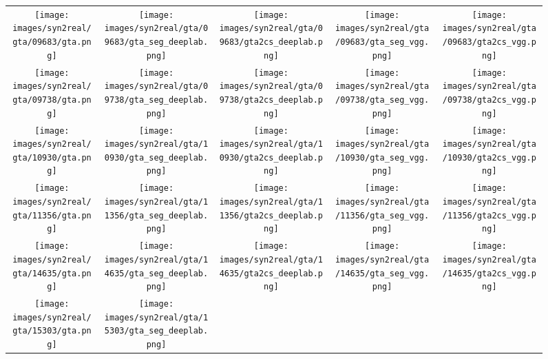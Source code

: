 \documentclass{bmvc2k}
\begin{document}
\begin{figure}[!htb]
	\centering
	\begin{tabular}{@{\hskip2pt}c@{\hskip2pt}c@{\hskip2pt}c@{\hskip2pt}c@{\hskip2pt}c}
		\texttt{[image: images/syn2real/gta/09683/gta.png]}&
		\texttt{[image: images/syn2real/gta/09683/gta\_seg\_deeplab.png]}&
		\texttt{[image: images/syn2real/gta/09683/gta2cs\_deeplab.png]}&
		\texttt{[image: images/syn2real/gta/09683/gta\_seg\_vgg.png]}&
		\texttt{[image: images/syn2real/gta/09683/gta2cs\_vgg.png]}\\
		\texttt{[image: images/syn2real/gta/09738/gta.png]}&
		\texttt{[image: images/syn2real/gta/09738/gta\_seg\_deeplab.png]}&
		\texttt{[image: images/syn2real/gta/09738/gta2cs\_deeplab.png]}&
		\texttt{[image: images/syn2real/gta/09738/gta\_seg\_vgg.png]}&
		\texttt{[image: images/syn2real/gta/09738/gta2cs\_vgg.png]}\\
		\texttt{[image: images/syn2real/gta/10930/gta.png]}&
		\texttt{[image: images/syn2real/gta/10930/gta\_seg\_deeplab.png]}&
		\texttt{[image: images/syn2real/gta/10930/gta2cs\_deeplab.png]}&
		\texttt{[image: images/syn2real/gta/10930/gta\_seg\_vgg.png]}&
		\texttt{[image: images/syn2real/gta/10930/gta2cs\_vgg.png]}\\
		\texttt{[image: images/syn2real/gta/11356/gta.png]}&
		\texttt{[image: images/syn2real/gta/11356/gta\_seg\_deeplab.png]}&
		\texttt{[image: images/syn2real/gta/11356/gta2cs\_deeplab.png]}&
		\texttt{[image: images/syn2real/gta/11356/gta\_seg\_vgg.png]}&
		\texttt{[image: images/syn2real/gta/11356/gta2cs\_vgg.png]}\\
		\texttt{[image: images/syn2real/gta/14635/gta.png]}&
		\texttt{[image: images/syn2real/gta/14635/gta\_seg\_deeplab.png]}&
		\texttt{[image: images/syn2real/gta/14635/gta2cs\_deeplab.png]}&
		\texttt{[image: images/syn2real/gta/14635/gta\_seg\_vgg.png]}&
		\texttt{[image: images/syn2real/gta/14635/gta2cs\_vgg.png]}\\
		\texttt{[image: images/syn2real/gta/15303/gta.png]}&
		\texttt{[image: images/syn2real/gta/15303/gta\_seg\_deeplab.png]}&

\end{tabular}
\end{figure}
\end{document}
